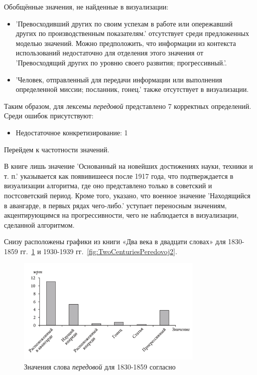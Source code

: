 Обобщённые значения, не найденные в визуализации:
\begin{itemize}
    \item ’Превосходивший других по своим успехам в работе или опережавший других по производственным показателям.’
отсутствует среди предложенных моделью значений.
Можно предположить, что информации из контекста использований недостаточно для отделения этого значения от
’Превосходящий других по уровню своего развития; прогрессивный.’. %

    \item ’Человек, отправленный для передачи информации или выполнения определенной миссии; посланник, гонец.’ также отсутствует в визуализации.
\end{itemize}

Таким образом, для лексемы \textit{передовой} представлено 7 корректных определений.
Среди ошибок присутствуют:
\begin{itemize}
    \item Недостаточное конкретизирование: 1
\end{itemize}

Перейдем к частотности значений.

В книге лишь значение ’Основанный на новейших достижениях науки, техники и т. п.’
указывается как появивишееся после 1917 года, что подтверждается
в визуализации алгоритма, где оно представлено только в советский и постсоветский период.
Кроме того, указано, что военное значение ’Находящийся в авангарде, в первых рядах чего-либо.’
уступает переносным значениям, акцентирующимся на прогрессивности, чего
не наблюдается в визуализации, сделанной алгоритмом.

Снизу расположены графики из книги «Два века в двадцати словах»
для 1830-1859 гг.~\ref{fig:TwoCenturiesPeredovoj1} и 1930-1939 гг.~\ref{fig:TwoCenturiesPeredovoj2}.

\noindent %
\begin{figure}[H]
    \centering %
    \includegraphics[width=0.8\textwidth]{img/book/peredovoj/1830-1859}
    \caption{Значения слова \textit{передовой} для 1830-1859 согласно~\cite{TwoCenturies}}
    \label{fig:TwoCenturiesPeredovoj1}
\end{figure}

